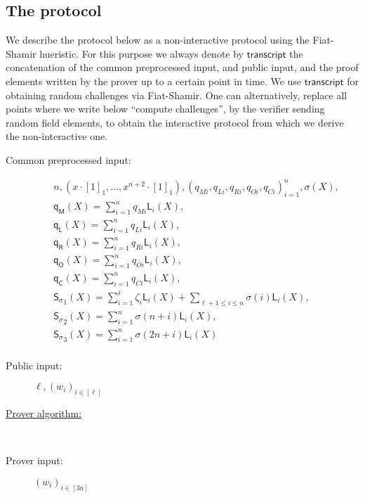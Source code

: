 \documentclass[11pt]{article} %
\newcommand{\vecc}[2]{\ensuremath{(#1)_{#2}}\xspace}
\newcommand{\sigpoly}{\ensuremath{\mathsf{S_{\sigma}}}\xspace}
\newcommand{\lagrangepoly}{\ensuremath{\mathsf{L}}\xspace}
\newcommand{\selmultpoly}{\ensuremath{\mathsf{q_M}}\xspace}
\newcommand{\selleftpoly}{\ensuremath{\mathsf{q_L}}\xspace}
\newcommand{\selrightpoly}{\ensuremath{\mathsf{q_R}}\xspace}
\newcommand{\seloutpoly}{\ensuremath{\mathsf{q_O}}\xspace}
\newcommand{\selconstpoly}{\ensuremath{\mathsf{q_C}}\xspace}
\newcommand{\transcript}{\ensuremath{\mathsf{transcript}}\xspace}
\begin{document}
\subsection{The protocol}

We describe the protocol below as a non-interactive protocol using the Fiat-Shamir hueristic.
For this purpose we always denote by \transcript the concatenation of the common preprocessed input, and public input, and the proof elements written by the prover up to a certain point in time.
We use \transcript for obtaining random challenges via Fiat-Shamir. One can alternatively, replace all points where we write below ``compute challenges'', by the verifier sending random field elements, to obtain the interactive protocol from which we derive the non-interactive one.
\begin{description}
	\item[Common preprocessed input:]
	$$\begin{array}{l}n, (x \cdot [1]_1, \ldots, {x^{n+2}} \cdot [1]_1), (q_{Mi}, q_{Li}, q_{Ri}, q_{Oi}, q_{Ci})_{i=1}^n, \sigma(X), \\
	\selmultpoly(X) = \sum_{i=1}^nq_{Mi}\lagrangepoly_i(X), \\
	\selleftpoly(X) = \sum_{i=1}^nq_{Li}\lagrangepoly_i(X), \\
	\selrightpoly(X) = \sum_{i=1}^nq_{Ri}\lagrangepoly_i(X), \\ \seloutpoly(X) = \sum_{i=1}^nq_{Oi}\lagrangepoly_i(X), \\ \selconstpoly(X) = \sum_{i=1}^nq_{Ci}\lagrangepoly_i(X), \\
	\sigpoly_1(X) =  \sum_{i=1}^\ell \zeta_i \lagrangepoly_i(X) + \sum_{\ell+1\leq i \leq n} \sigma(i) \lagrangepoly_i(X), \\ \sigpoly_2(X) = \sum_{i=1}^n \sigma(n + i) \lagrangepoly_i(X), \\ \sigpoly_3(X) = \sum_{i=1}^n \sigma(2n + i) \lagrangepoly_i(X)\\ \
\end{array}$$
	\item[Public input:] 	$\ell, \vecc{w_i}{i\in [\ell]}$
	\item[\underline{Prover algorithm:}] \ \\
	\item[Prover input:] $\vecc{w_i}{i\in [3n]}$
	
	\end{description}
	
	
	\noindent
\end{document}
